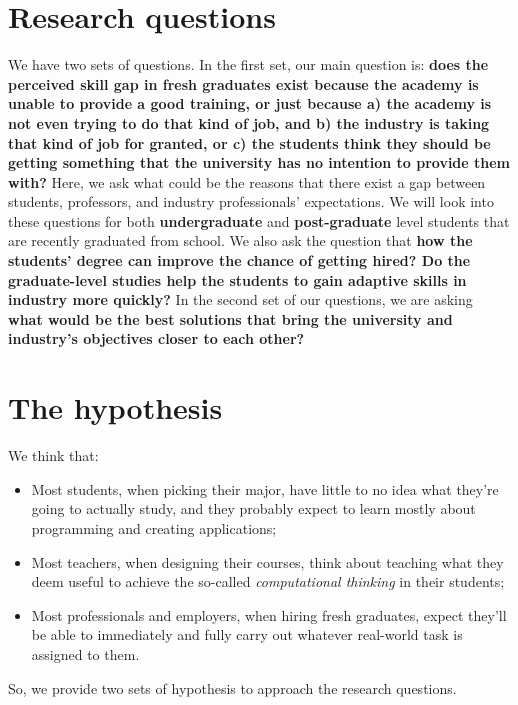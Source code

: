 \documentclass{sigchi}
\begin{document}
\section{Research questions}
We have two sets of questions. In the first set, our main question is: \textbf{does the perceived skill gap in fresh graduates exist because the academy is unable to provide a good training, or just because a) the academy is not even trying to do that kind of job, and b) the industry is taking that kind of job for granted, or c) the students think they should be getting something that the university has no intention to provide them with?} Here, we ask what could be the reasons that there exist a gap between students, professors, and industry professionals' expectations. We will look into these questions for both \textbf{undergraduate} and \textbf{post-graduate} level students that are recently graduated from school. We also ask the question that \textbf{how the students' degree can improve the chance of getting hired? Do the graduate-level studies help the students to gain adaptive skills in industry more quickly?}\newline
In the second set of our questions, we are asking \textbf{what would be the best solutions that bring the university and industry's objectives closer to each other?} 

\section{The hypothesis}
We think that:
\begin{itemize}
\item Most students, when picking their major, have little to no idea what they're going to actually study, and they probably expect to learn mostly about programming and creating applications;
\item Most teachers, when designing their courses, think about teaching what they deem useful to achieve the so-called \textit{computational thinking} in their students;
\item Most professionals and employers, when hiring fresh graduates, expect they'll be able to immediately and fully carry out whatever real-world task is assigned to them.
\end{itemize}

So, we provide two sets of hypothesis to approach the research questions.
\end{document}
